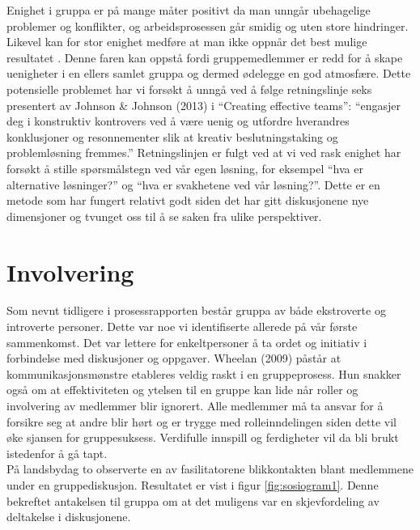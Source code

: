 Enighet i gruppa er på mange måter positivt da man unngår ubehagelige problemer og konflikter, og arbeidsprosessen går smidig og uten store hindringer. Likevel kan for stor enighet medføre at man ikke oppnår det best mulige resultatet \citep{effectiveTeams}. Denne faren kan oppstå fordi gruppemedlemmer er redd for å skape uenigheter i en ellers samlet gruppa og dermed ødelegge en god atmosfære. Dette potensielle problemet har vi forsøkt å unngå ved å følge retningslinje seks presentert av Johnson \& Johnson (2013)\citep{gruppeteori} i ``Creating effective teams'': ``engasjer deg i konstruktiv kontrovers ved å være uenig og utfordre hverandres konklusjoner og resonnementer slik at kreativ beslutningstaking og problemløsning fremmes.'' Retningslinjen er fulgt ved at vi ved rask enighet har forsøkt å stille spørsmålstegn ved vår egen løsning, for eksempel ``hva er alternative løsninger?'' og ``hva er svakhetene ved vår løsning?''. Dette er en metode som har fungert relativt godt siden det har gitt diskusjonene nye dimensjoner og tvunget oss til å se saken fra ulike perspektiver.\\

\section{Involvering}
\label{sec:involvering}
Som nevnt tidligere i prosessrapporten består gruppa av både ekstroverte og introverte personer. Dette var noe vi identifiserte allerede på vår første sammenkomst. Det var lettere for enkeltpersoner å ta ordet og initiativ i forbindelse med diskusjoner og oppgaver. Wheelan (2009)\citep{effectiveTeams} påstår at kommunikasjonsmønstre etableres veldig raskt i en gruppeprosess. Hun snakker også om at effektiviteten og ytelsen til en gruppe kan lide når roller og involvering av medlemmer blir ignorert. Alle medlemmer må ta ansvar for å forsikre seg at andre blir hørt og er trygge med rolleinndelingen siden dette vil øke sjansen for gruppesuksess. Verdifulle innspill og ferdigheter vil da bli brukt istedenfor å gå tapt.\\

På landsbydag to observerte en av fasilitatorene blikkontakten blant medlemmene under en gruppediskusjon. Resultatet er vist i figur \ref{fig:sosiogram1}. Denne bekreftet antakelsen til gruppa om at det muligens var en skjevfordeling av deltakelse i diskusjonene.\\

